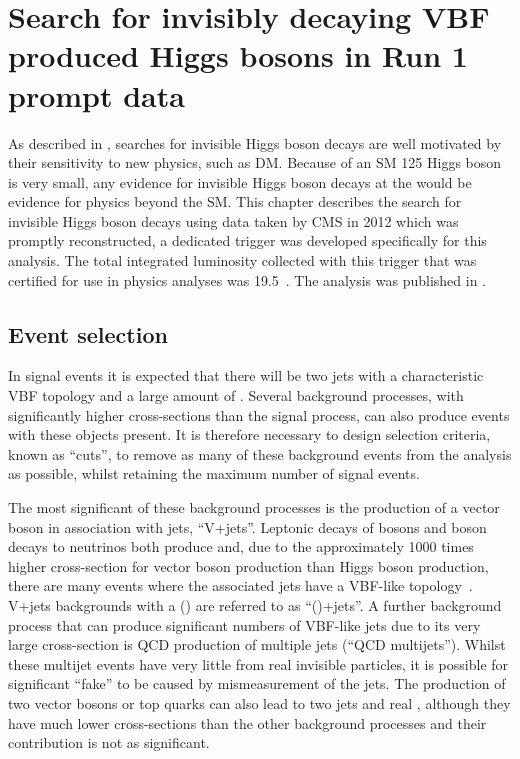\chapter{Search for invisibly decaying VBF produced Higgs bosons in Run 1 prompt data}
\label{chap:prompt}
As described in , searches for invisible Higgs boson decays are well motivated by their sensitivity to new physics, such as \ac{DM}. Because \BRinv of an \ac{SM} 125 \GeV Higgs boson is very small, any evidence for invisible Higgs boson decays at the \LHC would be evidence for physics beyond the \ac{SM}. This chapter describes the search for invisible Higgs boson decays using data taken by CMS in 2012 which was promptly reconstructed, a dedicated trigger was developed specifically for this analysis. The total integrated luminosity collected with this trigger that was certified for use in physics analyses was 19.5\invfb~. The analysis was published in .

\section{Event selection}
\label{sec:promptsel}
In signal events it is expected that there will be two jets with a characteristic \ac{VBF} topology and a large amount of \MET. Several background processes, with significantly higher cross-sections than the signal process, can also produce events with these objects present. It is therefore necessary to design selection criteria, known as ``cuts'', to remove as many of these background events from the analysis as possible, whilst retaining the maximum number of signal events.

The most significant of these background processes is the production of a vector boson in association with jets, ``V+jets''. Leptonic decays of \PW bosons and \PZ boson decays to neutrinos both produce \MET and, due to the approximately 1000 times higher cross-section for vector boson production than Higgs boson production, there are many events where the associated jets have a \ac{VBF}-like topology~\cite{CMSSMPPublic}. V+jets backgrounds with a \PW (\PZ) are referred to as ``\PW(\PZ)+jets''.
A further background process that can produce significant numbers of \ac{VBF}-like jets due to its very large cross-section is \ac{QCD} production of multiple jets (``\ac{QCD} multijets''). Whilst these multijet events have very little \MET from real invisible particles, it is possible for significant ``fake'' \MET to be caused by mismeasurement of the jets. The production of two vector bosons or top quarks can also lead to two jets and real \MET, although they have much lower cross-sections than the other background processes and their contribution is not as significant. %

